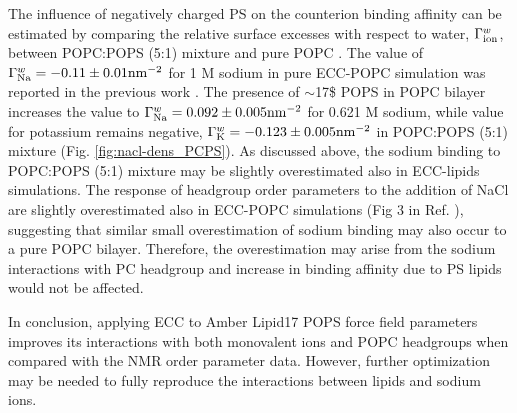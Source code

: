 \documentclass[journal=jpcbfk,manuscript=article]{achemso}
\begin{document}
% 
%
The influence of negatively charged PS on the counterion binding affinity can
be estimated by comparing the relative surface excesses with respect to water, $\Gamma ^{w} _{\rm ion}$,
between POPC:POPS (5:1) mixture and pure POPC \cite{melcr18}.
The value of $\Gamma ^{w} _{\rm Na}=-0.11 \pm 0.01 \mathrm{nm}^{-2}$ for 1 M sodium in pure ECC-POPC
simulation was reported in the previous work \cite{melcr18}.
The presence of $\sim$17\$ POPS in POPC bilayer increases the
value to $\Gamma ^{w} _{\rm Na}=0.092 \pm 0.005 \mathrm{nm}^{-2}$ 
for 0.621 M sodium, while value for potassium remains negative,
$\Gamma ^{w} _{\rm K}=-0.123 \pm 0.005 \mathrm{nm}^{-2}$ in POPC:POPS (5:1) mixture (Fig. \ref{fig:nacl-dens_PCPS}).
As discussed above, the sodium binding to POPC:POPS (5:1) mixture may be slightly overestimated also in
ECC-lipids simulations. The response of headgroup order parameters to the addition of NaCl are
slightly overestimated also in ECC-POPC simulations (Fig 3 in Ref. ),
suggesting that similar small overestimation of sodium binding may also occur to a pure POPC bilayer.
Therefore, the overestimation may arise from the sodium interactions with PC headgroup and
increase in binding affinity due to PS lipids would not be affected.

In conclusion, applying ECC to Amber Lipid17 POPS force field parameters improves its
interactions with both monovalent ions and POPC headgroups when compared with the NMR order parameter data.
However, further optimization may be needed to fully reproduce the interactions between lipids and
sodium ions.
\end{document}
